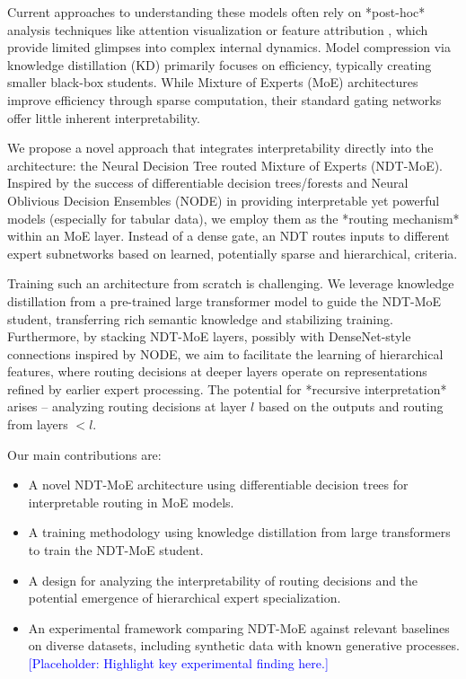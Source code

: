 \documentclass[11pt,a4paper]{article}
\newcommand{\placeholder}[1]{\textcolor{blue}{[Placeholder: #1]}}
\begin{document}
Current approaches to understanding these models often rely on *post-hoc* analysis techniques like attention visualization or feature attribution \citep{lundberg2017unified, ribeiro2016why}, which provide limited glimpses into complex internal dynamics. Model compression via knowledge distillation (KD) \citep{hinton2015distilling} primarily focuses on efficiency, typically creating smaller black-box students. While Mixture of Experts (MoE) architectures \citep{shazeer2017outrageously, fedus2022switch} improve efficiency through sparse computation, their standard gating networks offer little inherent interpretability.

We propose a novel approach that integrates interpretability directly into the architecture: the Neural Decision Tree routed Mixture of Experts (NDT-MoE). Inspired by the success of differentiable decision trees/forests \citep{kontschieder2015deep} and Neural Oblivious Decision Ensembles (NODE) \citep{popov2019neural} in providing interpretable yet powerful models (especially for tabular data), we employ them as the *routing mechanism* within an MoE layer. Instead of a dense gate, an NDT routes inputs to different expert subnetworks based on learned, potentially sparse and hierarchical, criteria.

Training such an architecture from scratch is challenging. We leverage knowledge distillation from a pre-trained large transformer model to guide the NDT-MoE student, transferring rich semantic knowledge and stabilizing training. Furthermore, by stacking NDT-MoE layers, possibly with DenseNet-style connections \citep{huang2017densely} inspired by NODE, we aim to facilitate the learning of hierarchical features, where routing decisions at deeper layers operate on representations refined by earlier expert processing. The potential for *recursive interpretation* arises – analyzing routing decisions at layer $l$ based on the outputs and routing from layers $< l$.

Our main contributions are:
\begin{itemize}
    \item A novel NDT-MoE architecture using differentiable decision trees for interpretable routing in MoE models.
    \item A training methodology using knowledge distillation from large transformers to train the NDT-MoE student.
    \item A design for analyzing the interpretability of routing decisions and the potential emergence of hierarchical expert specialization.
    \item An experimental framework comparing NDT-MoE against relevant baselines on diverse datasets, including synthetic data with known generative processes. \placeholder{Highlight key experimental finding here.}
\end{itemize}
\end{document}
